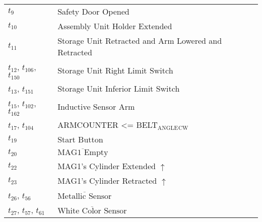 \begin{longtable}{M{5cm}M{10cm}}
\hyperlink{completeNet:t9}{\hypertarget{completeTable:t9}{$t_{9}$}} & Safety Door Opened\\
\hyperlink{completeNet:t10}{\hypertarget{completeTable:t10}{$t_{10}$}} & Assembly Unit Holder Extended\\
\hyperlink{completeNet:t11}{\hypertarget{completeTable:t11}{$t_{11}$}} & Storage Unit Retracted and Arm Lowered and Retracted\\
\hyperlink{completeNet:t12}{\hypertarget{completeTable:t12}{$t_{12}$}}, \hyperlink{completeNet:t106}{\hypertarget{completeTable:t106}{$t_{106}$}}, \hyperlink{completeNet:t150}{\hypertarget{completeTable:t150}{$t_{150}$}} & Storage Unit Right Limit Switch\\
\hyperlink{completeNet:t13}{\hypertarget{completeTable:t13}{$t_{13}$}}, \hyperlink{completeNet:t151}{\hypertarget{completeTable:t151}{$t_{151}$}} & Storage Unit Inferior Limit Switch\\
\hyperlink{completeNet:t15}{\hypertarget{completeTable:t15}{$t_{15}$}}, \hyperlink{completeNet:t102}{\hypertarget{completeTable:t102}{$t_{102}$}}, \hyperlink{completeNet:t162}{\hypertarget{completeTable:t162}{$t_{162}$}} & Inductive Sensor Arm\\
\hyperlink{completeNet:t17}{\hypertarget{completeTable:t17}{$t_{17}$}}, \hyperlink{completeNet:t104}{\hypertarget{completeTable:t104}{$t_{104}$}} & ARMCOUNTER <= BELT\(_{\text{ANGLE}}\)\(_{\text{CW}}\)\\
\hyperlink{completeNet:t19}{\hypertarget{completeTable:t19}{$t_{19}$}} & Start Button\\
\hyperlink{completeNet:t20}{\hypertarget{completeTable:t20}{$t_{20}$}} & \(\overline{\mbox{MAG1 Empty}}\)\\
\hyperlink{completeNet:t22}{\hypertarget{completeTable:t22}{$t_{22}$}} & MAG1's Cylinder Extended \(\uparrow\)\\
\hyperlink{completeNet:t23}{\hypertarget{completeTable:t23}{$t_{23}$}} & MAG1's Cylinder Retracted \(\uparrow\)\\
\hyperlink{completeNet:t26}{\hypertarget{completeTable:t26}{$t_{26}$}}, \hyperlink{completeNet:t56}{\hypertarget{completeTable:t56}{$t_{56}$}} & \(\overline{\mbox{Metallic Sensor}}\)\\
\hyperlink{completeNet:t27}{\hypertarget{completeTable:t27}{$t_{27}$}}, \hyperlink{completeNet:t57}{\hypertarget{completeTable:t57}{$t_{57}$}}, \hyperlink{completeNet:t61}{\hypertarget{completeTable:t61}{$t_{61}$}} & \(\overline{\mbox{White Color Sensor}}\)\\

\end{longtable}
